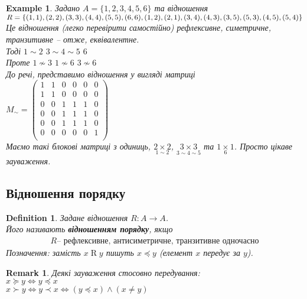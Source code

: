 \documentclass[a4paper, 14pt]{extarticle}
\theoremstyle{theoremdd}
\theoremstyle{theoremdd}
\newtheorem{definition}[theorem]{Definition}
\theoremstyle{theoremdd}
\theoremstyle{theoremdd}
\theoremstyle{theoremdd}
\newtheorem{example}[theorem]{Example}
\theoremstyle{theoremdd}
\theoremstyle{theoremdd}
\theoremstyle{theoremdd}
\theoremstyle{theoremdd}
\theoremstyle{theoremdd}
\theoremstyle{theoremdd}
\newtheorem{remark}[theorem]{Remark}
\theoremstyle{theoremdd}
\theoremstyle{theoremdd}
\theoremstyle{theoremdd}
\theoremstyle{theoremdd}
\begin{document}
\begin{example}
Задано $A = \{1,2,3,4,5,6\}$ та відношення\\
$R = \{(1,1),(2,2),(3,3),(4,4),(5,5),(6,6),(1,2),(2,1),(3,4),(4,3),(3,5), \\ (5,3),(4,5),(5,4)\}$\\
Це відношення (легко перевірити самостійно) рефлексивне, симетричне, транзитивне -- отже, еквівалентне.\\
Тоді $1 \sim 2$ \hspace{0.5cm} $3 \sim 4 \sim 5$ \hspace{0.5cm} $6$\\
Проте $1 \not\sim 3$ \hspace{0.5cm} $1 \not\sim 6$ \hspace{0.5cm} $3 \not\sim 6$
\bigskip \\
До речі, представимо відношення у вигляді матриці\\
$M_{\sim} = \begin{pmatrix}
1 & 1 & 0 & 0 & 0 & 0 \\
1 & 1 & 0 & 0 & 0 & 0 \\
0 & 0 & 1 & 1 & 1 & 0 \\
0 & 0 & 1 & 1 & 1 & 0 \\
0 & 0 & 1 & 1 & 1 & 0 \\
0 & 0 & 0 & 0 & 0 & 1 \\
\end{pmatrix}$\\
Маємо такі блокові матриці з одиниць, $\underset{1 \sim 2}{2 \times 2}$, $\underset{3 \sim 4 \sim 5}{3 \times 3}$ та $\underset{6}{1 \times 1}$. Просто цікаве зауваження.
\end{example}

\subsection{Відношення порядку}
\begin{definition}
Задане відношення $R \colon A \to A$.\\
Його називають \textbf{відношенням порядку}, якщо
\begin{align*}
R \text{-- рефлексивне, антисиметричне, транзитивне одночасно}
\end{align*}
Позначення: замість $x  \mathrel{R} y$ пишуть $x \preceq y$ (елемент $x$ передує за $y$).
\end{definition}

\begin{remark}
Деякі зауваження стосовно передування:\\
$x \succeq  y \iff y \preceq x$\\
$x \succ y \iff y \prec x \iff (y \preceq x) \wedge (x \neq y)$
\end{remark}
\end{document}
